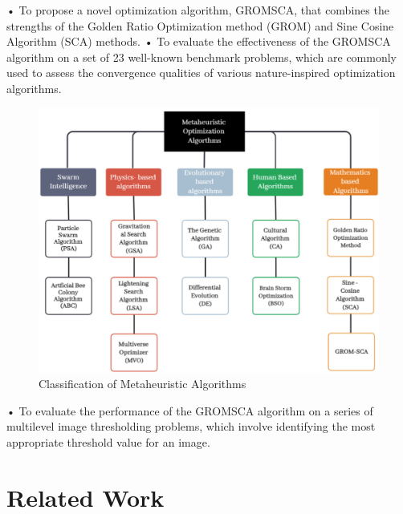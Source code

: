• To propose a novel optimization algorithm, GROMSCA, that combines the strengths of the Golden Ratio Optimization method (GROM) and Sine Cosine Algorithm (SCA) methods.
• To evaluate the effectiveness of the GROMSCA algorithm on a set of 23 well-known benchmark problems, which are commonly used to assess the convergence qualities of various nature-inspired optimization algorithms.

\begin{figure}[htbp]
\centering
\includegraphics[width=0.8\linewidth]{images/ebe3a7b154e18831ae9d0a9f65bea45ad7c9b370237b7923d4237a3e0452e32e.jpg}
\caption{Classification of Metaheuristic Algorithms}
\label{fig:1}
\end{figure}


• To evaluate the performance of the GROMSCA algorithm on a series of multilevel image thresholding problems, which involve identifying the most appropriate threshold value for an image.

\section{Related Work}

